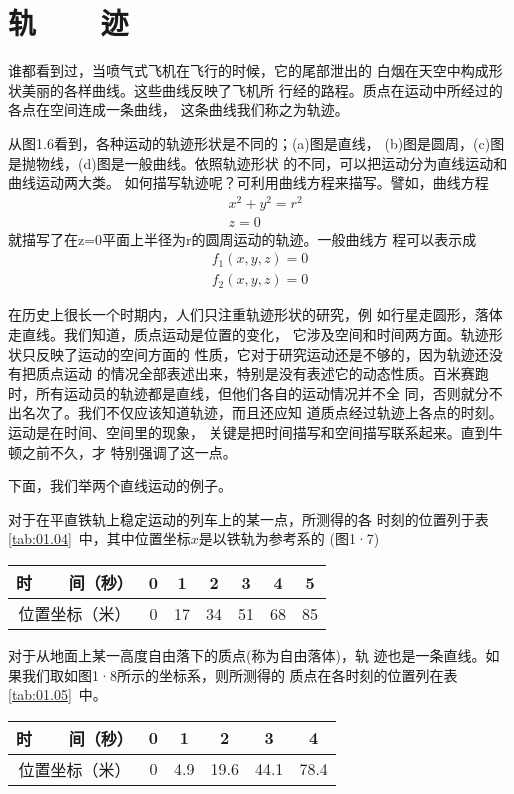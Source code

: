 \section[轨迹]{轨~~~~迹}\label{sec:01.05}

谁都看到过，当喷气式飞机在飞行的时候，它的尾部泄出的
白烟在天空中构成形状美丽的各样曲线。这些曲线反映了飞机所
行经的路程。质点在运动中所经过的各点在空间连成一条曲线，
这条曲线我们称之为轨迹。

从图1.6看到，各种运动的轨迹形状是不同的；(a)图是直线，
(b)图是圆周，(c)图是抛物线，(d)图是一般曲线。依照轨迹形状
的不同，可以把运动分为直线运动和曲线运动两大类。
如何描写轨迹呢？可利用曲线方程来描写。譬如，曲线方程
\begin{align*}
     & x^2+y^2=r^2 \\
     & z=0
\end{align*}
就描写了在z=0平面上半径为r的圆周运动的轨迹。一般曲线方
程可以表示成
\begin{align*}
    f_1(x,y,z)=0 \\
    f_2(x,y,z)=0
\end{align*}

在历史上很长一个时期内，人们只注重轨迹形状的研究，例
如行星走圆形，落体走直线。我们知道，质点运动是位置的变化，
它涉及空间和时间两方面。轨迹形状只反映了运动的空间方面的
性质，它对于研究运动还是不够的，因为轨迹还没有把质点运动
的情况全部表述出来，特别是没有表述它的动态性质。百米赛跑
时，所有运动员的轨迹都是直线，但他们各自的运动情况并不全
同，否则就分不出名次了。我们不仅应该知道轨迹，而且还应知
道质点经过轨迹上各点的时刻。运动是在时间、空间里的现象，
关键是把时间描写和空间描写联系起来。直到牛顿之前不久，才
特别强调了这一点。

下面，我们举两个直线运动的例子。

对于在平直铁轨上稳定运动的列车上的某一点，所测得的各
时刻的位置列于表\ref{tab:01.04}~中，其中位置坐标$x$是以铁轨为参考系的
(图1·7)
\begin{tablex}[!h]{1.1em}
    \caption{}
    \label{tab:01.04}
    \centering
        \begin{tabular}{c|c|c|c|c|c|c}
            \toprule
            时~~~~间（秒） & 0 & 1  & 2  & 3  & 4  & 5  \\
            \midrule
            位置坐标（米） & 0 & 17 & 34 & 51 & 68 & 85 \\
            \bottomrule
        \end{tabular}
\end{tablex}

对于从地面上某一高度自由落下的质点(称为自由落体)，轨
迹也是一条直线。如果我们取如图1·8所示的坐标系，则所测得的
质点在各时刻的位置列在表\ref{tab:01.05}~中。
\begin{tablex}[!h]{1.15em}
    \caption{}
    \label{tab:01.05}
    \centering
        \begin{tabular}{c|c|c|c|c|c}
            \toprule
            时~~~~间（秒） & 0 & 1   & 2    & 3    & 4    \\
            \midrule
            位置坐标（米） & 0 & 4.9 & 19.6 & 44.1 & 78.4 \\
            \bottomrule
        \end{tabular}
\end{tablex}

